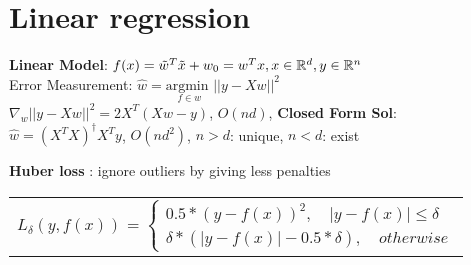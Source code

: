 
\section{Linear regression}
\textbf{Linear Model}: $f(x) = \Tilde{w}^T\Tilde{x}+w_0 = w^Tx, x \in \mathbb{R}^d, y \in \mathbb{R}^n$\\
    Error Measurement: $\hat{w}= \underset{f \in w}{\text{argmin }}||y-Xw||^2$\\
    $\nabla_w||y-Xw||^2 = 2X^T(Xw-y)$, $O(nd)$, 
    \textbf{Closed Form Sol}: $\hat{w}= (X^TX)^\dagger X^Ty$, $O(nd^2)$, $n > d$: unique, $n < d$: exist 
    
\textbf{Huber loss }:
ignore outliers by giving less penalties
    
\begin{tabular}{c}
    $L_{\delta}(y, f(x))$ =
    $\begin{cases} 
        0.5 * (y - f(x))^2, \quad |y - f(x)| \leq \delta \\ 
        \delta * (|y - f(x)| - 0.5 * \delta),   \quad otherwise
    \end{cases}$
    \vspace{-0.3cm}
\end{tabular}
